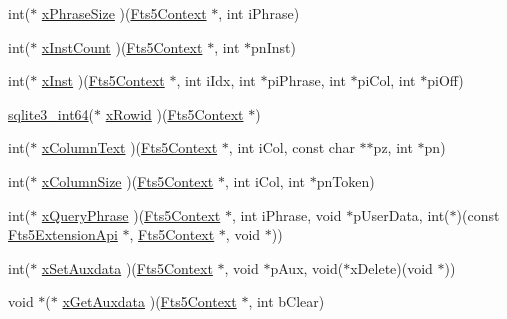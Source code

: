 \begin{DoxyCompactItemize}
\item 
int($\ast$ \mbox{\hyperlink{struct_fts5_extension_api_aeda6faa66f47f9116c9ceba882aaedd2}{x\+Phrase\+Size}} )(\mbox{\hyperlink{sqlite3_8h_a97821b95ebebd43db901977ffd5b26bc}{Fts5\+Context}} $\ast$, int i\+Phrase)
\item 
int($\ast$ \mbox{\hyperlink{struct_fts5_extension_api_af57aff7a8aa8402bb37a77892c4daf45}{x\+Inst\+Count}} )(\mbox{\hyperlink{sqlite3_8h_a97821b95ebebd43db901977ffd5b26bc}{Fts5\+Context}} $\ast$, int $\ast$pn\+Inst)
\item 
int($\ast$ \mbox{\hyperlink{struct_fts5_extension_api_a85e17f20db782b20b503f1d803a47a9e}{x\+Inst}} )(\mbox{\hyperlink{sqlite3_8h_a97821b95ebebd43db901977ffd5b26bc}{Fts5\+Context}} $\ast$, int i\+Idx, int $\ast$pi\+Phrase, int $\ast$pi\+Col, int $\ast$pi\+Off)
\item 
\mbox{\hyperlink{sqlite3_8h_a0a4d3e6c1ad46f90e746b920ab6ca0d2}{sqlite3\+\_\+int64}}($\ast$ \mbox{\hyperlink{struct_fts5_extension_api_acc4336c9f7bf39defa1acbdbf5df0020}{x\+Rowid}} )(\mbox{\hyperlink{sqlite3_8h_a97821b95ebebd43db901977ffd5b26bc}{Fts5\+Context}} $\ast$)
\item 
int($\ast$ \mbox{\hyperlink{struct_fts5_extension_api_a03c7fcd31a751fc34d25e5288045f91d}{x\+Column\+Text}} )(\mbox{\hyperlink{sqlite3_8h_a97821b95ebebd43db901977ffd5b26bc}{Fts5\+Context}} $\ast$, int i\+Col, const char $\ast$$\ast$pz, int $\ast$pn)
\item 
int($\ast$ \mbox{\hyperlink{struct_fts5_extension_api_aefe6eb4685546e58f056a61da39a2bcb}{x\+Column\+Size}} )(\mbox{\hyperlink{sqlite3_8h_a97821b95ebebd43db901977ffd5b26bc}{Fts5\+Context}} $\ast$, int i\+Col, int $\ast$pn\+Token)
\item 
int($\ast$ \mbox{\hyperlink{struct_fts5_extension_api_a8f6dcf0a1d246b235f98f5bbb214e28d}{x\+Query\+Phrase}} )(\mbox{\hyperlink{sqlite3_8h_a97821b95ebebd43db901977ffd5b26bc}{Fts5\+Context}} $\ast$, int i\+Phrase, void $\ast$p\+User\+Data, int($\ast$)(const \mbox{\hyperlink{struct_fts5_extension_api}{Fts5\+Extension\+Api}} $\ast$, \mbox{\hyperlink{sqlite3_8h_a97821b95ebebd43db901977ffd5b26bc}{Fts5\+Context}} $\ast$, void $\ast$))
\item 
int($\ast$ \mbox{\hyperlink{struct_fts5_extension_api_a0f59a6c383a478ed95efdb7e4a95de80}{x\+Set\+Auxdata}} )(\mbox{\hyperlink{sqlite3_8h_a97821b95ebebd43db901977ffd5b26bc}{Fts5\+Context}} $\ast$, void $\ast$p\+Aux, void($\ast$x\+Delete)(void $\ast$))
\item 
void $\ast$($\ast$ \mbox{\hyperlink{struct_fts5_extension_api_a63ba9aaf30fe9fe5fbcd1541ff38abff}{x\+Get\+Auxdata}} )(\mbox{\hyperlink{sqlite3_8h_a97821b95ebebd43db901977ffd5b26bc}{Fts5\+Context}} $\ast$, int b\+Clear)
$$
\end{DoxyCompactItemize}
